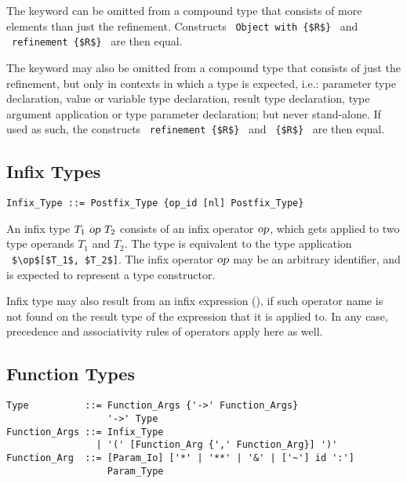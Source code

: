 The  keyword can be omitted from a compound type that consists of more elements than just the refinement. Constructs ~\lstinline!Object with {$R$}!~ and ~\lstinline!refinement {$R$}!~ are then equal. 

The  keyword may also be omitted from a compound type that consists of just the refinement, but only in contexts in which a type is expected, i.e.: parameter type declaration, value or variable type declaration, result type declaration, type argument application or type parameter declaration; but never stand-alone. If used as such, the constructs ~\lstinline!refinement {$R$}!~ and ~\lstinline!{$R$}!~ are then equal. 






\subsection{Infix Types}
\label{sec:infix-types}

\syntax\begin{lstlisting}
Infix_Type ::= Postfix_Type {op_id [nl] Postfix_Type}
\end{lstlisting}

An infix type $T_1\ \mbox{\sl op}\ T_2$ consists of an infix operator $\mbox{\sl op}$, which gets applied to two type operands $T_1$ and $T_2$. The type is equivalent to the type application ~\lstinline!$\op$[$T_1$, $T_2$]!. The infix operator $\mbox{\sl op}$ may be an arbitrary identifier, and is expected to represent a type constructor. 

Infix type may also result from an infix expression (), if such operator name is not found on the result type of the expression that it is applied to. In any case, precedence and associativity rules of operators apply here as well. 






\subsection{Function Types}
\label{sec:function-types}

\syntax\begin{lstlisting}
Type          ::= Function_Args {'->' Function_Args}
                  '->' Type
Function_Args ::= Infix_Type
                | '(' [Function_Arg {',' Function_Arg}] ')'
Function_Arg  ::= [Param_Io] ['*' | '**' | '&' | ['~'] id ':']
                  Param_Type
\end{lstlisting}

